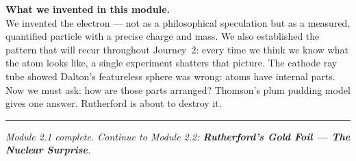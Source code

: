 \documentclass[12pt, a4paper]{book}
\theoremstyle{definition}
\begin{document}
\vspace{1.5em}
\begin{center}
\begin{tcolorbox}[
  enhanced, colback=DiscoveryColor!8, colframe=DiscoveryColor,
  width=0.88\textwidth, arc=3pt
]
\centering\sffamily\small
\textbf{What we invented in this module.}\\[4pt]
We invented the electron --- not as a philosophical speculation
but as a measured, quantified particle with a precise charge
and mass.
We also established the pattern that will recur throughout
Journey~2: every time we think we know what the atom looks like,
a single experiment shatters that picture.
The cathode ray tube showed Dalton's featureless sphere
was wrong: atoms have internal parts.
Now we must ask: how are those parts arranged?
Thomson's plum pudding model gives one answer.
Rutherford is about to destroy it.
\end{tcolorbox}
\end{center}

\vspace{2em}
\noindent\textcolor{JourneyColor!40}{\rule{\textwidth}{0.6pt}}
\begin{center}
\textit{\sffamily\small
Module 2.1 complete. Continue to Module 2.2:
\textbf{Rutherford's Gold Foil --- The Nuclear Surprise}.}
\end{center}
\end{document}
